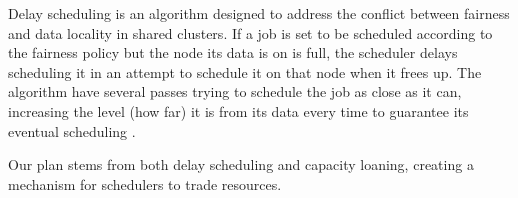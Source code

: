 Delay scheduling is an algorithm designed to address the conflict between fairness and data locality in 
shared clusters. 
If a job is set to be scheduled according to the fairness policy but the node its data is on is full, 
the scheduler delays scheduling it in an attempt to schedule it on that node when it frees up. The algorithm have 
several passes trying to schedule the job as close as it can, increasing the level (how far) it is from its data every time 
to guarantee its eventual scheduling \cite{zaharia_delay_2010}.
%


Our plan stems from both delay scheduling and capacity loaning, creating a mechanism for schedulers 
to trade resources.
